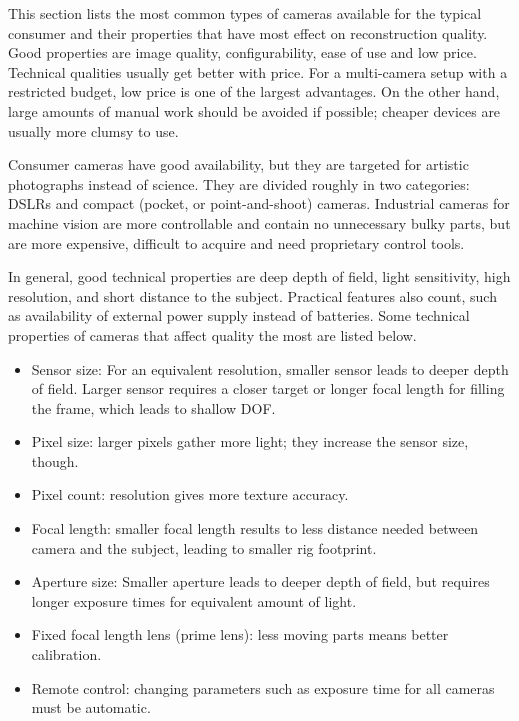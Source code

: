 
This section lists the most common types of cameras available for the typical consumer and their properties that have most effect on reconstruction quality.
Good properties are image quality, configurability, ease of use and low price.
Technical qualities usually get better with price.
For a multi-camera setup with a restricted budget, low price is one of the largest advantages.
On the other hand, large amounts of manual work should be avoided if possible; cheaper devices are usually more clumsy to use.


Consumer cameras have good availability, but they are targeted for artistic photographs instead of science.
They are divided roughly in two categories: DSLRs and compact (pocket, or point-and-shoot) cameras.
Industrial cameras for machine vision are more controllable and contain no unnecessary bulky parts, but are more expensive, difficult to acquire and need proprietary control tools.

In general, good technical properties are deep depth of field, light sensitivity, high resolution, and short distance to the subject.
Practical features also count, such as availability of external power supply instead of batteries.
Some technical properties of cameras that affect quality the most are listed below.

\begin{itemize}
	\item Sensor size: For an equivalent resolution, smaller sensor leads to deeper depth of field. Larger sensor requires a closer target or longer focal length for filling the frame, which leads to shallow DOF.
	\item Pixel size: larger pixels gather more light; they increase the sensor size, though.
	\item Pixel count: resolution gives more texture accuracy.
	\item Focal length: smaller focal length results to less distance needed between camera and the subject, leading to smaller rig footprint.
	\item Aperture size: Smaller aperture leads to deeper depth of field, but requires longer exposure times for equivalent amount of light.
	\item Fixed focal length lens (prime lens): less moving parts means better calibration.
	\item Remote control: changing parameters such as exposure time for all cameras must be automatic.
\end{itemize}

